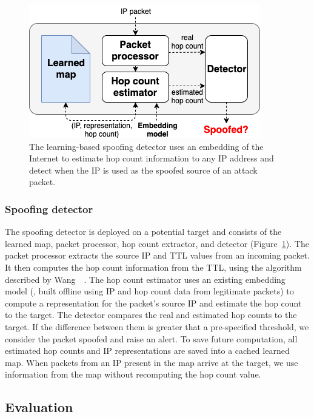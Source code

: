 \begin{figure}[t]
	\centering
	\includegraphics[width=.6\linewidth]{Graph/spoof/spoofing-detector.png}
	\caption{The learning-based spoofing detector uses an embedding of the Internet to estimate hop count information to any IP address and detect when the IP is used as the spoofed source of an attack packet.}
	\label{fig:detector}
\end{figure}

\subsubsection{Spoofing detector}

The spoofing detector is deployed on a potential target and consists of the learned map, packet processor, hop count extractor, and detector (Figure~\ref{fig:detector}). The packet processor extracts the source IP and TTL values from an incoming packet. It then computes the hop count information from the TTL, using the algorithm described by Wang~\etal{}~\citep{iphc}. The hop count estimator uses an existing embedding model (\ie{}, built offline using IP and hop count data from legitimate packets) to compute a representation for the packet's source IP and estimate the hop count to the target. 
%
The detector compares the real and estimated hop counts to the target. If the difference between them is greater that a pre-specified threshold, we consider the packet spoofed and raise an alert.
%
To save future computation, all estimated hop counts and IP representations are saved into a cached learned map. When packets from an IP present in the map arrive at the target, we use information from the map without recomputing the hop count value.



\subsection{Evaluation}
\label{spoof:eval}

